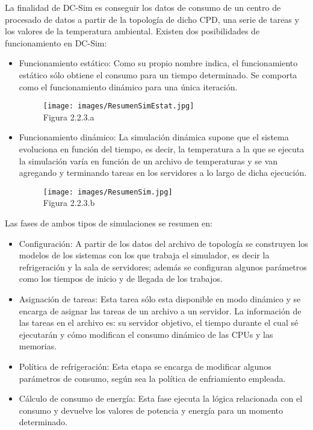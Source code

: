 La finalidad de DC-Sim es conseguir los datos de consumo de un centro de procesado de datos a partir de la topología de dicho CPD, una serie de tareas y los valores de la temperatura ambiental. Existen dos posibilidades de funcionamiento en DC-Sim:
\begin{itemize}
\item Funcionamiento estático: Como su propio nombre indica, el funcionamiento estático sólo obtiene el consumo para un tiempo determinado. Se comporta como el funcionamiento dinámico para una única iteración.
\begin{figure}[H]
\begin{center}
\texttt{[image: images/ResumenSimEstat.jpg]}
\\[0.5cm]
Figura 2.2.3.a
\end{center}
\end{figure}
\item Funcionamiento dinámico: La simulación dinámica supone que el sistema evoluciona en función del tiempo, es decir, la temperatura a la que se ejecuta la simulación varía en función de un archivo de temperaturas y se van agregando y terminando tareas en los servidores a lo largo de dicha ejecución.
\begin{figure}[H]
\begin{center}
\texttt{[image: images/ResumenSim.jpg]}
\\[0.5cm]
Figura 2.2.3.b
\end{center}
\end{figure}
\end{itemize}
Las fases de ambos tipos de simulaciones se resumen en:
\begin{itemize}
\item Configuración: A partir de los datos del archivo de topología se construyen los modelos de los sistemas con los que trabaja el simulador, es decir la refrigeración y la sala de servidores; además se configuran algunos parámetros como los tiempos de inicio y de llegada de los trabajos.
\item Asignación de tareas: Esta tarea sólo esta disponible en modo dinámico y se encarga de asignar las tareas de un archivo a un servidor. La información de las tareas en el archivo es: su servidor objetivo, el tiempo durante el cual sé ejecutarán y cómo modifican el consumo dinámico de las CPUs y las memorias.
\item Política de refrigeración: Esta etapa se encarga de modificar algunos parámetros de consumo, según sea la política de enfriamiento empleada.
\item Cálculo de consumo de energía: Esta fase ejecuta la lógica relacionada con el consumo y  devuelve los valores de potencia y energía para un momento determinado.
\end{itemize}
